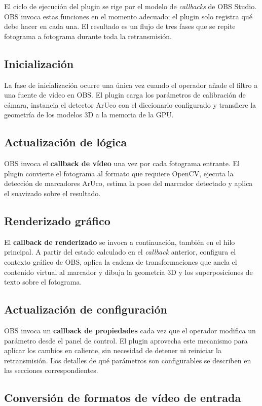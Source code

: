 El ciclo de ejecución del plugin se rige por el modelo de \textit{callbacks} de OBS Studio. OBS invoca estas funciones en el momento adecuado; el plugin solo registra qué debe hacer en cada una. El resultado es un flujo de tres fases que se repite fotograma a fotograma durante toda la retransmisión.

\subsection{Inicialización}
La fase de inicialización ocurre una única vez cuando el operador añade el filtro a una fuente de vídeo en OBS. El plugin carga los parámetros de calibración de cámara, instancia el detector ArUco con el diccionario configurado y transfiere la geometría de los modelos 3D a la memoria de la GPU.

\subsection{Actualización de lógica}
OBS invoca el \textbf{callback de vídeo} una vez por cada fotograma entrante. El plugin convierte el fotograma al formato que requiere OpenCV, ejecuta la detección de marcadores ArUco, estima la pose del marcador detectado y aplica el suavizado sobre el resultado.

\subsection{Renderizado gráfico}
El \textbf{callback de renderizado} se invoca a continuación, también en el hilo principal. A partir del estado calculado en el \textit{callback} anterior, configura el contexto gráfico de OBS, aplica la cadena de transformaciones que ancla el contenido virtual al marcador y dibuja la geometría 3D y los superposiciones de texto sobre el fotograma.

\subsection{Actualización de configuración}
OBS invoca un \textbf{callback de propiedades} cada vez que el operador modifica un parámetro desde el panel de control. El plugin aprovecha este mecanismo para aplicar los cambios en caliente, sin necesidad de detener ni reiniciar la retransmisión. Los detalles de qué parámetros son configurables se describen en las secciones correspondientes.
\subsection{Conversión de formatos de vídeo de entrada}
\label{subsubsec:formatos}

